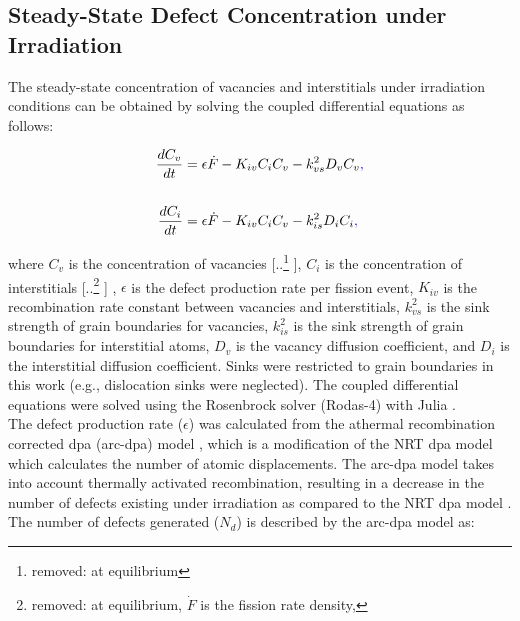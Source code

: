 \documentclass[preprint,12pt]{elsarticle}
\providecommand{\DIFadd}[1]{{\protect\color{blue} \sf #1}} %
\providecommand{\DIFdel}[1]{{\protect\color{red} [..\footnote{removed: #1} ]}} %
\providecommand{\DIFaddbegin}{} %
\providecommand{\DIFaddend}{} %
\providecommand{\DIFdelbegin}{} %
\providecommand{\DIFdelend}{} %
\newcommand{\DIFscaledelfig}{0.5}
\newlength{\DIFdelgraphicswidth} %
\newlength{\DIFdelgraphicsheight} %
\newcommand{\DIFaddincludegraphics}[2][]{{\color{blue}\fbox{\DIFOincludegraphics[#1]{#2}}}} %
\newcommand{\DIFdelincludegraphics}[2][]{%
\sbox{\DIFdelgraphicsbox}{\DIFOincludegraphics[#1]{#2}}%
\settoboxwidth{\DIFdelgraphicswidth}{\DIFdelgraphicsbox} %
\settoboxtotalheight{\DIFdelgraphicsheight}{\DIFdelgraphicsbox} %
\scalebox{\DIFscaledelfig}{%
\parbox[b]{\DIFdelgraphicswidth}{\usebox{\DIFdelgraphicsbox}\\[-\baselineskip] \rule{\DIFdelgraphicswidth}{0em}}\llap{\resizebox{\DIFdelgraphicswidth}{\DIFdelgraphicsheight}{%
\setlength{\unitlength}{\DIFdelgraphicswidth}%
\begin{picture}(1,1)%
\thicklines\linethickness{2pt} %
{\color[rgb]{1,0,0}\put(0,0){\framebox(1,1){}}}%
{\color[rgb]{1,0,0}\put(0,0){\line( 1,1){1}}}%
{\color[rgb]{1,0,0}\put(0,1){\line(1,-1){1}}}%
\end{picture}%
}\hspace*{3pt}}} %
} %
\DeclareRobustCommand{\DIFaddbegin}{\DIFOaddbegin \let\includegraphics\DIFaddincludegraphics} %
\DeclareRobustCommand{\DIFaddend}{\DIFOaddend \let\includegraphics\DIFOincludegraphics} %
\DeclareRobustCommand{\DIFdelbegin}{\DIFOdelbegin \let\includegraphics\DIFdelincludegraphics} %
\DeclareRobustCommand{\DIFdelend}{\DIFOaddend \let\includegraphics\DIFOincludegraphics} %
\begin{document}
\subsection{Steady-State Defect Concentration under Irradiation}
The steady-state concentration of vacancies and interstitials under irradiation conditions can be obtained by solving the coupled differential equations as follows:

\begin{align} 
\label{eqn:UMoratetheory1}
\frac{dC_{v}}{dt}={}&\epsilon\dot{F}- K_{iv}C_{i}C_{v} - k_{vs}^{2}D_{v}C_{v}\DIFaddbegin \DIFadd{, }\DIFaddend \\
\notag\\
\label{eqn:UMoratetheory2}
\frac{dC_{i}}{dt}={}&\epsilon\dot{F} - K_{iv}C_{i}C_{v} - k_{is}^{2}D_{i}C_{i}\DIFaddbegin \DIFadd{, 
}\DIFaddend \end{align}

\noindent where $C_{v}$ is the concentration of vacancies\DIFdelbegin \DIFdel{at equilibrium}\DIFdelend , $C_{i}$ is the concentration of interstitials\DIFdelbegin \DIFdel{at equilibrium, $\dot{F}$ is the fission rate density, }\DIFdelend \DIFaddbegin \DIFadd{, }\DIFaddend $\epsilon$ is the defect production rate per fission event, $K_{iv}$ is the recombination rate constant between vacancies and interstitials, $k_{vs}^{2}$ is the sink strength of grain boundaries for vacancies, $k_{is}^{2}$ is the sink strength of grain boundaries for interstitial atoms, $D_{v}$ is the vacancy diffusion coefficient, and $D_{i}$ is the interstitial diffusion coefficient. Sinks were restricted to grain boundaries in this work (e.g., dislocation sinks were neglected). \DIFaddbegin \DIFadd{The coupled differential equations were solved using the Rosenbrock solver (Rodas-4) with Julia \cite{wanner1996solving, bezanson2017julia}.}\DIFaddend \\ 
\indent The defect production rate ($\epsilon$) was calculated from the athermal recombination corrected dpa (arc-dpa) model \cite{nordlund2018improving}, which is a modification of the NRT dpa model \cite{norgett1975proposed} which calculates the number of atomic displacements. The arc-dpa model takes into account thermally activated recombination, resulting in a decrease in the number of defects existing under irradiation as compared to the NRT dpa model \cite{nordlund2018improving}. The number of defects generated ($N_{d}$) is described by the arc-dpa model as:\\
\end{document}
